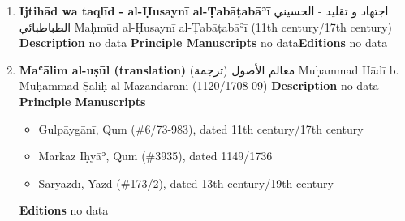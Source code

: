 \documentclass{article}
\begin{document}
\begin{enumerate}
      \item \textbf{Ijtihād wa taqlīd - al-Ḥusaynī al-Ṭabāṭabāʾī}
        \newline
        \textarabic{اجتهاد و تقليد - الحسيني الطباطبائي}
        \newline
        Maḥmūd al-Ḥusaynī al-Ṭabāṭabāʾī
        \newline
        (11th century/17th century)
        \newline
        \newline
        \textbf{Description}
        \newline	
        no data
        \newline
        \newline
    \textbf{Principle Manuscripts}
\newline
no data\newline\textbf{Editions}
\newline
no data\newline
      \item \textbf{Maʿālim al-uṣūl (translation)}
        \newline
        \textarabic{معالم الأصول (ترجمة)}
        \newline
        Muḥammad Hādī b. Muḥammad Ṣāliḥ al-Māzandarānī
        \newline
        (1120/1708-09)
        \newline
        \newline
        \textbf{Description}
        \newline	
        no data
        \newline
        \newline
    \textbf{Principle Manuscripts}
\begin{itemize}
    \item Gulpāygānī, Qum (\#6/73-983), dated 11th century/17th century
    
    \item Markaz Iḥyāʾ, Qum (\#3935), dated 1149/1736
    
    \item Saryazdī, Yazd (\#173/2), dated 13th century/19th century
    \end{itemize}
\textbf{Editions}
\newline
no data\newline\end{enumerate}
    
\end{document}
